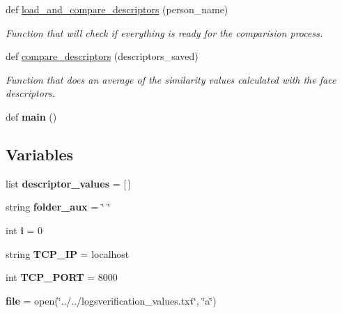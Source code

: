 \begin{DoxyCompactItemize}
def \hyperlink{namespaceverification__server_a5078e642441c12c9a89aa78e6c5974a7}{load\+\_\+and\+\_\+compare\+\_\+descriptors} (person\+\_\+name)
\begin{DoxyCompactList}\small\item\em Function that will check if everything is ready for the comparision process. \end{DoxyCompactList}\item 
def \hyperlink{namespaceverification__server_aca7965407a96b52124a620758241d0df}{compare\+\_\+descriptors} (descriptors\+\_\+saved)
\begin{DoxyCompactList}\small\item\em Function that does an average of the similarity values calculated with the face descriptors. \end{DoxyCompactList}\item 
def {\bfseries main} ()\hypertarget{namespaceverification__server_afda6c69ace67afd112218d39c890f83b}{}\label{namespaceverification__server_afda6c69ace67afd112218d39c890f83b}

\end{DoxyCompactItemize}
\subsection*{Variables}
\begin{DoxyCompactItemize}
\item 
list {\bfseries descriptor\+\_\+values} = \mbox{[}$\,$\mbox{]}\hypertarget{namespaceverification__server_a9afac50475b83368738162e5936a1a23}{}\label{namespaceverification__server_a9afac50475b83368738162e5936a1a23}

\item 
string {\bfseries folder\+\_\+aux} = \char`\"{} \char`\"{}\hypertarget{namespaceverification__server_ae644e6d5e2a3b0e7f51d19aab7d1b325}{}\label{namespaceverification__server_ae644e6d5e2a3b0e7f51d19aab7d1b325}

\item 
int {\bfseries i} = 0\hypertarget{namespaceverification__server_a37d55345204dd8a2ed29eb734b296f6c}{}\label{namespaceverification__server_a37d55345204dd8a2ed29eb734b296f6c}

\item 
string {\bfseries T\+C\+P\+\_\+\+IP} = \textquotesingle{}localhost\textquotesingle{}\hypertarget{namespaceverification__server_ad884dc0ccc20d93e94aa6d6e3f94c074}{}\label{namespaceverification__server_ad884dc0ccc20d93e94aa6d6e3f94c074}

\item 
int {\bfseries T\+C\+P\+\_\+\+P\+O\+RT} = 8000\hypertarget{namespaceverification__server_a76565f2723c68f981534575e6e46754a}{}\label{namespaceverification__server_a76565f2723c68f981534575e6e46754a}

\item 
{\bfseries file} = open(\char`\"{}../../logsverification\+\_\+values.\+txt\char`\"{}, \char`\"{}a\char`\"{})\hypertarget{namespaceverification__server_a9147b70e84ba7bbe7addfcdd51f4c0cf}{}\label{namespaceverification__server_a9147b70e84ba7bbe7addfcdd51f4c0cf}

\end{DoxyCompactItemize}


